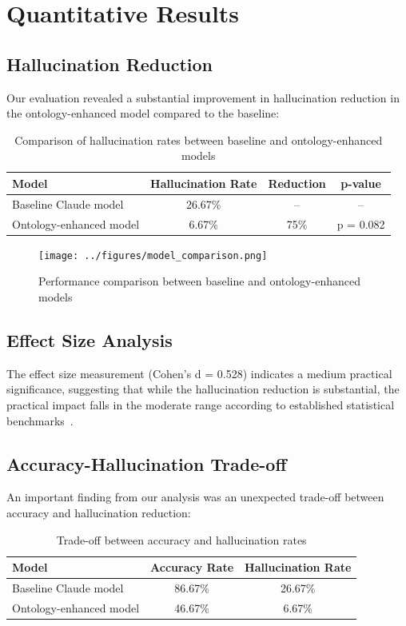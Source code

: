 \section{Quantitative Results}
\label{sec:quantitative-results}

\subsection{Hallucination Reduction}
Our evaluation revealed a substantial improvement in hallucination reduction in the ontology-enhanced model compared to the baseline:

\begin{table}[h]
\centering
\begin{tabular}{|l|c|c|c|}
\hline
\textbf{Model} & \textbf{Hallucination Rate} & \textbf{Reduction} & \textbf{p-value} \\
\hline
Baseline Claude model & 26.67\% & -- & -- \\
\hline
Ontology-enhanced model & 6.67\% & 75\% & p = 0.082 \\
\hline
\end{tabular}
\caption{Comparison of hallucination rates between baseline and ontology-enhanced models}
\label{tab:hallucination-rates}
\end{table}

\begin{figure}[h]
    \centering
    \texttt{[image: ../figures/model\_comparison.png]}
    \caption{Performance comparison between baseline and ontology-enhanced models}
    \label{fig:model-comparison}
\end{figure}

\subsection{Effect Size Analysis}
The effect size measurement (Cohen's d = 0.528) indicates a medium practical significance, suggesting that while the hallucination reduction is substantial, the practical impact falls in the moderate range according to established statistical benchmarks~\cite{chen2024comparing}.

\subsection{Accuracy-Hallucination Trade-off}
An important finding from our analysis was an unexpected trade-off between accuracy and hallucination reduction:

\begin{table}[h]
\centering
\begin{tabular}{|l|c|c|}
\hline
\textbf{Model} & \textbf{Accuracy Rate} & \textbf{Hallucination Rate} \\
\hline
Baseline Claude model & 86.67\% & 26.67\% \\
\hline
Ontology-enhanced model & 46.67\% & 6.67\% \\
\hline
\end{tabular}
\caption{Trade-off between accuracy and hallucination rates}
\label{tab:accuracy-hallucination-tradeoff}
\end{table}

